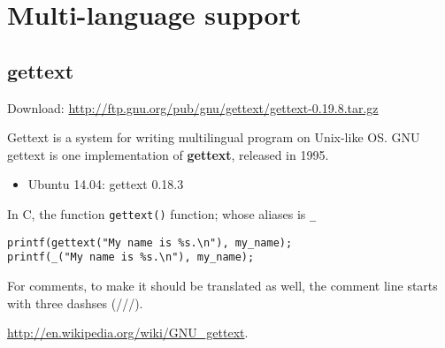 \chapter{Multi-language support}

\section{gettext}
\label{sec:gettext}

Download:
 \url{http://ftp.gnu.org/pub/gnu/gettext/gettext-0.19.8.tar.gz}


Gettext is a system for writing multilingual program on Unix-like OS. GNU
gettext is one implementation of {\bf gettext}, released in 1995.
\begin{itemize}
  \item Ubuntu 14.04: gettext 0.18.3
\end{itemize}

In C, the function \verb!gettext()! function; whose aliases is \verb!_!
\begin{verbatim}
printf(gettext("My name is %s.\n"), my_name);
printf(_("My name is %s.\n"), my_name);
\end{verbatim}

For comments, to make it should be translated as well, the comment line starts
with three dashses (///). 

\url{http://en.wikipedia.org/wiki/GNU_gettext}.

